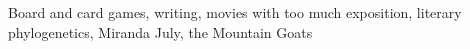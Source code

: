 \documentclass[margin, 10pt]{res} %
\begin{document}
\begin{resume}
Board and card games, writing, movies with too much exposition, literary phylogenetics, Miranda July, the Mountain Goats

%
%
%
%
%


\end{resume}
\end{document}
